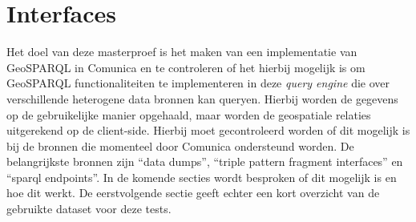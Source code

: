 \chapter{Interfaces}
\label{chap:interfaces}
Het doel van deze masterproef is het maken van een implementatie van GeoSPARQL in Comunica en te controleren of het hierbij mogelijk is om GeoSPARQL functionaliteiten te implementeren in deze \textit{query engine} die over verschillende heterogene data bronnen kan queryen. Hierbij worden de gegevens op de gebruikelijke manier opgehaald, maar worden de geospatiale relaties uitgerekend op de client-side. Hierbij moet gecontroleerd worden of dit mogelijk is bij de bronnen die momenteel door Comunica ondersteund worden. De belangrijkste bronnen zijn ``data dumps'', ``triple pattern fragment interfaces'' en ``sparql endpoints''. In de komende secties wordt besproken of dit mogelijk is en hoe dit werkt. De eerstvolgende sectie geeft echter een kort overzicht van de gebruikte dataset voor deze tests.

 
\newpage
 
\newpage
 
\newpage
 
\newpage